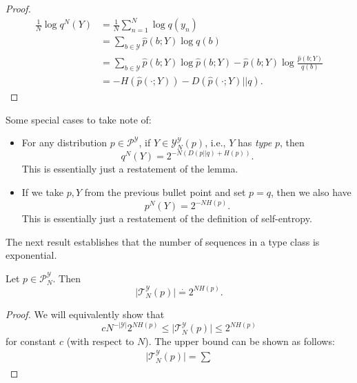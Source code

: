 \begin{proof}
\begin{align*}
	\frac{1}{N}\log q^N(Y) &= \frac{1}{N}\sum_{n=1}^N \log q(y_n) \\
												 &= \sum_{b\in \mathcal{Y}} \hat{p}(b; Y)\log q(b) \\
												 &= \sum_{b\in \mathcal{Y}} \hat{p}(b; Y)\log \hat{p}(b; Y) - \hat{p}(b; Y)\log \frac{\hat{p}(b; Y)}{q(b)} \\
												 &= -H(\hat{p}(\cdot; Y)) - D(\hat{p}(\cdot; Y)||q). 
\end{align*}
\end{proof}

\noindent Some special cases to take note of: 
\begin{itemize}
	\item For any distribution $p\in \mathcal{P}^{\mathcal{Y}}$, if $Y\in \mathcal{Y}_N^{\mathcal{Y}}(p)$, i.e., $Y$ has \textit{type} $p$, then 
		\[q^N(Y) = 2^{-N(D(p||q) + H(p))}.\]
		This is essentially just a restatement of the lemma. 
	\item If we take $p,Y$ from the previous bullet point and set $p=q$, then we also have
		\[p^N(Y) = 2^{-NH(p)}.\] 
		This is essentially just a restatement of the definition of self-entropy.
\end{itemize}

\noindent The next result establishes that the number of sequences in a type class is exponential.

\begin{theorem}
\lemlabel

Let $p\in \mathcal{P}_N^{\mathcal{Y}}$. Then
\[\vert \mathcal{T}_N^{\mathcal{Y}}(p)\vert \overset{\cdot}{=} 2^{NH(p)}.\] 
\end{theorem}

\begin{proof}
We will equivalently show that
\[cN^{-\vert \mathcal{Y}\vert}2^{NH(p)}\leq \vert \mathcal{T}_N^{\mathcal{Y}}(p)\vert \leq 2^{NH(p)}\] 
for constant $c$ (with respect to $N$). The upper bound can be shown as follows: 
\begin{align*}
	\vert \mathcal{T}_N^{\mathcal{Y}}(p)\vert = \sum_{}
\end{align*}
\end{proof}


